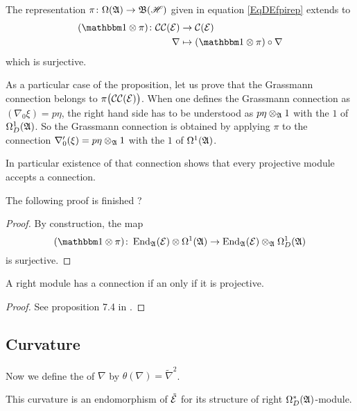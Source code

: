 \begin{proposition}\label{PropmCCmCsurjun}
The representation $\pi\colon \Omega(\mathfrak{A})\to \mathfrak{B}(\mathscr{H})$ given in equation \eqref{EqDEfpirep} extends to 
\begin{equation}
\begin{aligned}
 (\mtu\otimes\pi)\colon \mCC(\modE)&\to \mC(\modE) \\ 
   \nabla&\mapsto (\cun\otimes\pi)\circ\nabla 
\end{aligned}
\end{equation}
which is surjective.
\end{proposition}
As a particular case of the proposition, let us prove that the Grassmann connection belongs to $\pi\big( \mathcal{CC}(\mathcal{E}) \big)$. When one defines the Grassmann connection as $(\nabla_0\xi)=p\eta$, the right hand side has to be understood as $p\eta\otimes_{\mathfrak{A}}1$ with the $1$ of $\Omega^1_D(\mathfrak{A})$. So the Grassmann connection is obtained by applying $\pi$ to the connection $\nabla_0'(\xi)=p\eta\otimes_{\mathfrak{A}}1$ with the $1$ of $\Omega^1(\mathfrak{A})$.

In particular existence of that connection shows that every projective module accepts a connection.
\begin{probleme}
	The following proof is finished ?
\end{probleme}

\begin{proof}

By construction, the map 
\[ 
  (\cun\otimes\pi)  \colon \End_{\cA}(\modE)\otimes\Omega^1(\cA)\to \End_{\cA}(\modE)\otimes_{\cA}\Omega_D^1(\cA)
\]
is surjective. 


\end{proof}

\begin{proposition}
A right module has a connection if an only if it is projective.
\end{proposition}

\begin{proof}
See proposition 7.4 in \cite{Landi}.
\end{proof}


\subsection{Curvature}

Now we define the  of $\nabla$ by $\theta(\nabla)=\tilde\nabla^2$.

\begin{proposition}
This curvature is an endomorphism of $\tilde{\mathcal{E}}$ for its structure of right $\Omega^*_D(\mathfrak{A})$-module.
\end{proposition}

